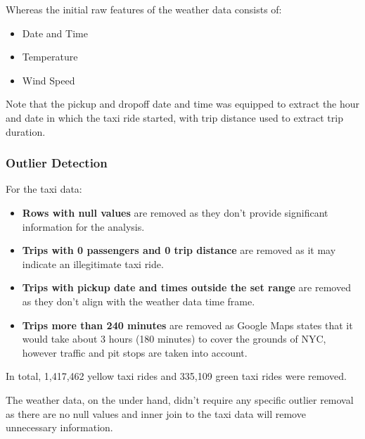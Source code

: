 \documentclass[11pt]{article}
\begin{document}
Whereas the initial raw features of the weather data consists of: \

\begin{minipage}[t]{0.3\textwidth}
\begin{itemize}
    \item Date and Time
\end{itemize}
\end{minipage}
\begin{minipage}[t]{0.3\textwidth}
\begin{itemize}
    \item Temperature
\end{itemize}
\end{minipage}
\begin{minipage}[t]{0.3\textwidth}
\begin{itemize}
    \item Wind Speed
\end{itemize}
\end{minipage}

Note that the pickup and dropoff date and time was equipped to extract the hour and date in which the taxi ride started, with trip distance used to extract trip duration.

\subsubsection{Outlier Detection}
For the taxi data:
\begin{itemize}
    \item \textbf{Rows with null values} are removed as they don't provide significant information for the analysis.
    \item \textbf{Trips with 0 passengers and 0 trip distance} are removed as it may indicate an illegitimate taxi ride.
    \item \textbf{Trips with pickup date and times outside the set range} are removed as they don't align with the weather data time frame.
    \item \textbf{Trips more than 240 minutes} are removed as Google Maps states that it would take about 3 hours (180 minutes) to cover the grounds of NYC, however traffic and pit stops are taken into account. 
\end{itemize}
In total, 1,417,462 yellow taxi rides and 335,109 green taxi rides were removed.

The weather data, on the under hand, didn't require any specific outlier removal as there are no null values and inner join to the taxi data will remove unnecessary information.
\end{document}

